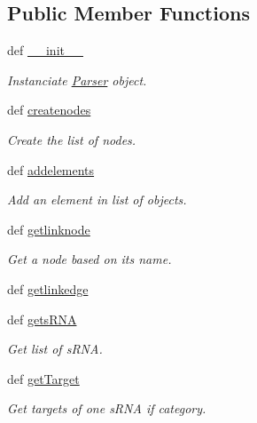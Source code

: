 \subsection*{\-Public \-Member \-Functions}
\begin{DoxyCompactItemize}
\item 
def \hyperlink{classirna_1_1David2tulip_1_1Parser_1_1Parser_a080b6d3cce99a19ab0e7dea9d2b57ef8}{\-\_\-\-\_\-init\-\_\-\-\_\-}
\begin{DoxyCompactList}\small\item\em \-Instanciate \hyperlink{classirna_1_1David2tulip_1_1Parser_1_1Parser}{\-Parser} object. \end{DoxyCompactList}\item 
def \hyperlink{classirna_1_1David2tulip_1_1Parser_1_1Parser_a23bca5e1db11f3497915c942ca94e347}{createnodes}
\begin{DoxyCompactList}\small\item\em \-Create the list of nodes. \end{DoxyCompactList}\item 
def \hyperlink{classirna_1_1David2tulip_1_1Parser_1_1Parser_a65596f7524df5c1b6640259fafbaa443}{addelements}
\begin{DoxyCompactList}\small\item\em \-Add an element in list of objects. \end{DoxyCompactList}\item 
def \hyperlink{classirna_1_1David2tulip_1_1Parser_1_1Parser_a6da4dec335ef8d773850154988f08c9a}{getlinknode}
\begin{DoxyCompactList}\small\item\em \-Get a node based on its name. \end{DoxyCompactList}\item 
def \hyperlink{classirna_1_1David2tulip_1_1Parser_1_1Parser_ab75069a93653a3ad5fe4013c2981c825}{getlinkedge}
\item 
def \hyperlink{classirna_1_1David2tulip_1_1Parser_1_1Parser_a9b6b9346ecc71ff58337484b8a2344cb}{gets\-R\-N\-A}
\begin{DoxyCompactList}\small\item\em \-Get list of s\-R\-N\-A. \end{DoxyCompactList}\item 
def \hyperlink{classirna_1_1David2tulip_1_1Parser_1_1Parser_a0ae20192af6754a40bc567ca1c1ce833}{get\-Target}
\begin{DoxyCompactList}\small\item\em \-Get targets of one s\-R\-N\-A if category. \end{DoxyCompactList}\item 

\end{DoxyCompactItemize}

